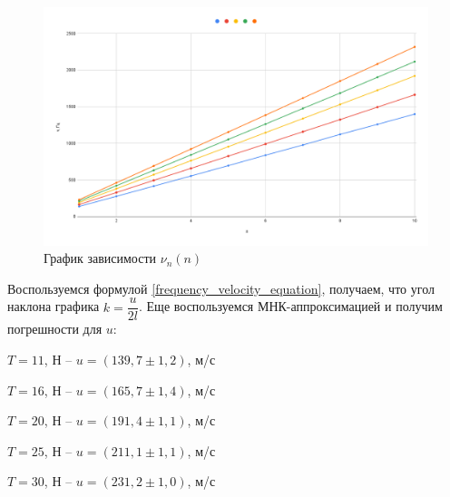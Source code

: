 \documentclass[a4paper, 12pt]{article}
\begin{document}
    \begin{figure}[h!]
        \begin{center}
            \includegraphics[width = 1.0\textwidth]{chart.png}
            \caption{График зависимости $\nu_n (n)$}
        \end{center}
    \end{figure}

    \newpage
    
    \begin{center}
    
    Воспользуемся формулой \eqref{frequency_velocity_equation}, получаем, что угол наклона графика $k = \dfrac{u}{2l}$. Еще воспользуемся МНК-аппроксимацией и получим погрешности для $u$:

    \end{center}

    \begin{itemize}
        \begin{center}
		\item $T = 11$, Н -- $u = (139,7 \pm 1,2)$, м/с
		\item  $T = 16$, Н -- $u = (165,7 \pm 1,4)$, м/с
		\item  $T = 20$, Н -- $u = (191,4 \pm 1,1)$, м/с
		\item  $T = 25$, Н -- $u = (211,1 \pm 1,1)$, м/с
		\item  $T = 30$, Н -- $u = (231,2 \pm 1,0)$, м/с
        \end{center}
    \end{itemize}
\end{document}
